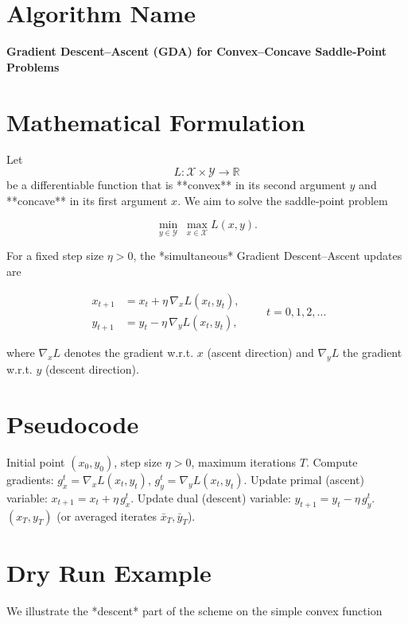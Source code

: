 \documentclass{article}
\newcommand{\R}{\mathbb{R}}
\begin{document}
\section*{Algorithm Name}
\textbf{Gradient Descent–Ascent (GDA) for Convex–Concave Saddle‑Point Problems}

\section*{Mathematical Formulation}
Let 
\[
L:\mathcal{X}\times\mathcal{Y}\rightarrow\R
\]
be a differentiable function that is **convex** in its second argument $y$ and **concave** in its first argument $x$.
We aim to solve the saddle‑point problem  

\[
\min_{y\in\mathcal{Y}}\;\max_{x\in\mathcal{X}} L(x,y).
\]

For a fixed step size $\eta>0$, the *simultaneous* Gradient Descent–Ascent updates are  

\[
\boxed{
\begin{aligned}
x_{t+1} &= x_{t} + \eta \,\nabla_{x} L(x_{t},y_{t}),\\[4pt]
y_{t+1} &= y_{t} - \eta \,\nabla_{y} L(x_{t},y_{t}),
\end{aligned}}
\qquad t=0,1,2,\dots
\]

where $\nabla_{x}L$ denotes the gradient w.r.t. $x$ (ascent direction) and $\nabla_{y}L$ the gradient w.r.t. $y$ (descent direction).

\section*{Pseudocode}
\begin{algorithm}[H]
\caption{Gradient Descent–Ascent (GDA)}
\begin{algorithmic}[1]
\REQUIRE Initial point $(x_{0},y_{0})$, step size $\eta>0$, maximum iterations $T$.
    \STATE Compute gradients: $g_{x}^{t}= \nabla_{x}L(x_{t},y_{t})$, \; $g_{y}^{t}= \nabla_{y}L(x_{t},y_{t})$.
    \STATE Update primal (ascent) variable: $x_{t+1}=x_{t}+ \eta\, g_{x}^{t}$.
    \STATE Update dual (descent) variable: $y_{t+1}=y_{t}- \eta\, g_{y}^{t}$.
\ENDFOR
\RETURN $(x_{T},y_{T})$ (or averaged iterates $\bar x_T,\bar y_T$).
\end{algorithmic}
\end{algorithm}

\section*{Dry Run Example}
We illustrate the *descent* part of the scheme on the simple convex function  
\end{document}

